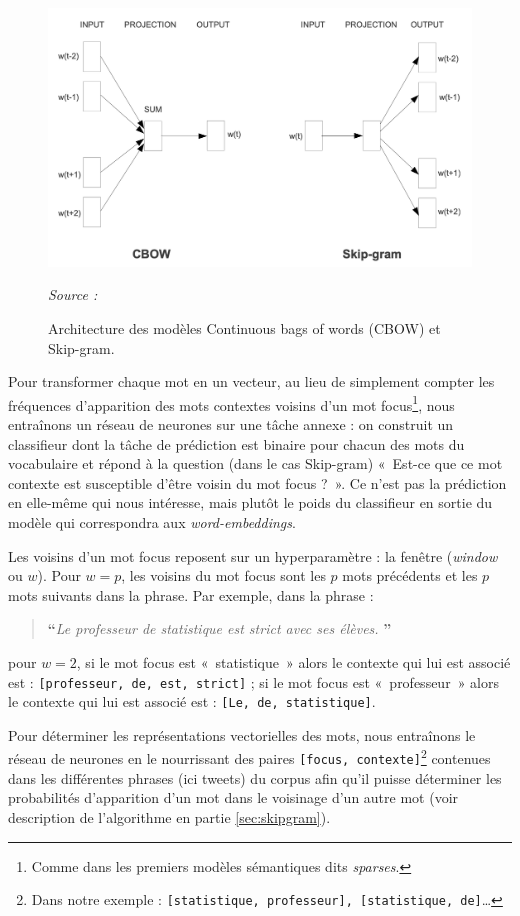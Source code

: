 \documentclass[11pt,french,french]{article}
\let\rmarkdownfootnote\footnote%
\def\footnote{\protect\rmarkdownfootnote}
\begin{document}
\begin{figure}[htp]
\centering
\includegraphics[width=.6\textwidth]{img/cbow_skip_gram.png}
\captionsetup{margin=0cm,format=hang,justification=justified}
\caption{Architecture des modèles Continuous bags of words (CBOW) et Skip-gram.}\label{fig:cbowskipgram}
\footnotesize
\emph{Source : \cite{Mikolov}}
\end{figure}

Pour transformer chaque mot en un vecteur, au lieu de simplement compter
les fréquences d'apparition des mots contextes voisins d'un mot
focus\footnote{Comme dans les premiers modèles sémantiques dits
  \emph{sparses}.}, nous entraînons un réseau de neurones sur une tâche
annexe : on construit un classifieur dont la tâche de prédiction est
binaire pour chacun des mots du vocabulaire et répond à la question
(dans le cas Skip-gram) «~Est-ce que ce mot contexte est susceptible
d'être voisin du mot focus ?~». Ce n'est pas la prédiction en elle-même
qui nous intéresse, mais plutôt le poids du classifieur en sortie du
modèle qui correspondra aux \emph{word-embeddings}.

Les voisins d'un mot focus reposent sur un hyperparamètre : la fenêtre
(\emph{window} ou \(w\)). Pour \(w = p\), les voisins du mot focus sont
les \(p\) mots précédents et les \(p\) mots suivants dans la phrase. Par
exemple, dans la phrase :

\begin{quote}
\LARGE \textbf{``}\normalsize \emph{Le professeur de statistique est strict avec ses élèves.} \LARGE \textbf{''}\normalsize
\end{quote}

pour \(w=2\), si le mot focus est «~statistique~» alors le contexte qui
lui est associé est : \texttt{{[}professeur,\ de,\ est,\ strict{]}} ; si
le mot focus est «~professeur~» alors le contexte qui lui est associé
est : \texttt{{[}Le,\ de,\ statistique{]}}.

Pour déterminer les représentations vectorielles des mots, nous
entraînons le réseau de neurones en le nourrissant des paires
\texttt{{[}focus,\ contexte{]}}\footnote{Dans notre exemple :
  \texttt{{[}statistique,\ professeur{]},\ {[}statistique,\ de{]}}\dots}
contenues dans les différentes phrases (ici tweets) du corpus afin qu'il
puisse déterminer les probabilités d'apparition d'un mot dans le
voisinage d'un autre mot (voir description de l'algorithme en partie
\ref{sec:skipgram}).
\end{document}
